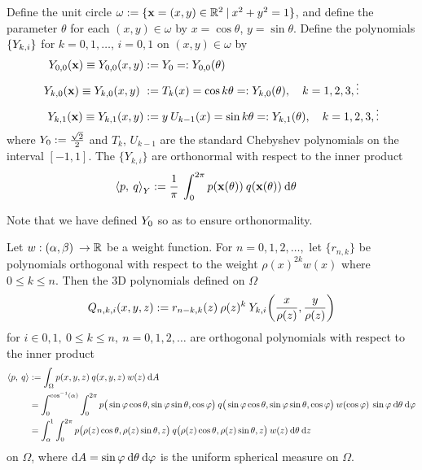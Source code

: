 \documentclass[11pt, oneside]{article}   	%
\begin{document}
\begin{definition}\label{def:Ydefinition}
	Define the unit circle $\omega := \{ \mathbf{x} = (x,y) \in \mathbb{R}^2 \: | \: x^2 + y^2 = 1\}$, and define the parameter $\theta$ for each $(x,y) \in \omega$ by $x = \cos\theta$, $y = \sin\theta$. Define the polynomials $\{Y_{k,i}\}$ for $k = 0, 1, \dots$, $i = 0, 1$ on $(x,y) \in \omega$ by
\begin{align*}
	Y_{0,0}(\mathbf{x}) \equiv Y_{0,0}(x, y) &:= Y_{0} =: Y_{0,0}(\theta) \\
	Y_{k,0}(\mathbf{x}) \equiv Y_{k,0}(x, y) \ &:= T_k(x) = \cos k \theta =: Y_{k,0}(\theta), \quad k = 1,2,3,\vdots \\
	Y_{k,1}(\mathbf{x}) \equiv Y_{k,1}(x, y) &:= y \: U_{k-1}(x) = \sin k \theta =: Y_{k,1}(\theta), \quad k = 1,2,3,\vdots
\end{align*}
where $Y_{0} := \frac{\sqrt{2}}{2}$ and $T_k$, $U_{k-1}$ are the standard Chebyshev polynomials on the interval $[-1,1]$. The $\{Y_{k,i}\}$ are orthonormal with respect to the inner product
\begin{align*}
	\ip< p, \: q >_{\ch} &:= \frac{1}{\pi} \: \int_0^{2\pi} p(\xvec(\theta)) \: q(\xvec(\theta)) \: \D \theta
\end{align*}
\end{definition}
Note that we have defined $Y_0$ so as to ensure orthonormality. 

\begin{proposition}\label{prop:construction}
	Let $w : (\alpha,\beta) \: \to \mathbb{R}$ be a weight function. For $n = 0,1,2,\dots, $ let $\{r_{n,k}\}$ be polynomials orthogonal with respect to the weight $\rho(x)^{2k} w(x)$ where $0 \le k \le n$. Then the 3D polynomials defined on $\Omega$
\begin{align*}
	\scopnki(x,y,z) := r_{n-k,k}(z) \: \rho(z)^k \: \ch_{k,i}\fpr({x \over \rho(z)}, {y \over \rho(z)})
\end{align*}
for $i \in {0,1}, \: 0 \le k \le n, \: n = 0,1,2,\dots$ are orthogonal polynomials with respect to the inner product
\begin{align*}
	\ip< p, \: q > &:= \int_\Omega p(x,y,z) \: q(x,y,z) \: w(z) \: \D A \\
	&= \int_0^{\cos^{-1}(\alpha)} \int_0^{2\pi} p\big(\sinphi \costheta, \sinphi \sintheta, \cosphi \big) \: q\big(\sinphi \costheta, \sinphi \sintheta, \cosphi \big) \: w(\cosphi) \: \sinphi \: \D \theta \: \D \varphi \\
	&= \int_\alpha^1 \int_0^{2\pi} p\big(\rho(z) \cos\theta, \rho(z) \sin\theta, z\big) \: q\big(\rho(z) \cos\theta, \rho(z) \sin \theta, z\big) \: w(z) \: \D \theta \: \D z
\end{align*}
on $\Omega$, where ${\rm d} A = \sin\varphi \: {\rm d} \theta \: {\rm d} \varphi$ is the uniform spherical measure on $\Omega$. 
\end{proposition}
\end{document}
